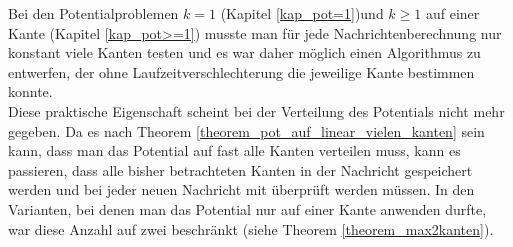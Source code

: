 Bei den Potentialproblemen $k = 1$ (Kapitel \ref{kap_pot=1})und $k \geq 1$ auf einer Kante (Kapitel \ref{kap_pot>=1}) musste man für jede Nachrichtenberechnung nur konstant viele Kanten testen und es war daher möglich einen Algorithmus zu entwerfen, der ohne Laufzeitverschlechterung die jeweilige Kante bestimmen konnte.
\\
Diese praktische Eigenschaft scheint bei der Verteilung des Potentials nicht mehr gegeben. Da es nach Theorem \ref{theorem_pot_auf_linear_vielen_kanten} sein kann, dass man das Potential auf fast alle Kanten verteilen muss, kann es passieren, dass alle bisher betrachteten Kanten in der Nachricht gespeichert werden und bei jeder neuen Nachricht mit überprüft werden müssen. In den Varianten, bei denen man das Potential nur auf einer Kante anwenden durfte, war diese Anzahl auf zwei beschränkt (siehe Theorem \ref{theorem_max2kanten}).


